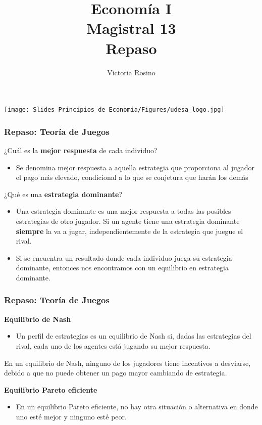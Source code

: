 \documentclass{beamer}
\title[Economía I]{Economía I \vspace{3mm}
\\ Magistral 13 \vspace{3mm} \\ Repaso}
\date{}
\author[Victoria Rosino]{Victoria Rosino}
\institute[]{Universidad de San Andrés}
\begin{document}
\begin{frame}
\vspace{0.3cm}
\titlepage
\centering
\vspace{-0.9cm}
\texttt{[image: Slides Principios de Economia/Figures/udesa\_logo.jpg]} 
\end{frame}



\begin{frame}
\frametitle{Repaso: Teoría de Juegos}
    ¿Cuál es la \textbf{mejor respuesta} de cada individuo?
    \begin{itemize}
        \item  Se denomina mejor respuesta a aquella estrategia que proporciona al jugador el pago más elevado, condicional a lo que se conjetura que harán los demás
    \end{itemize}
    \vspace{2mm}
    ¿Qué es una \textbf{estrategia dominante}?
    \begin{itemize}
        \item  Una estrategia dominante es una mejor respuesta a todas las posibles estrategias de otro jugador. Si un agente tiene una estrategia dominante \textbf{siempre} la va a jugar, independientemente de la estrategia que juegue el rival.
        \item Si se encuentra un resultado donde cada individuo juega su estrategia dominante, entonces nos encontramos con un equilibrio en estrategia dominante.
        \end{itemize}
\end{frame}

\begin{frame}
\frametitle{Repaso: Teoría de Juegos}
\textbf{Equilibrio de Nash}
    \begin{itemize}
        \item  Un perfil de estrategias es un equilibrio de Nash si, dadas las estrategias del rival, cada uno de los agentes está jugando su mejor respuesta.
    \end{itemize}
    \begin{boxB}
        \centering
        En un equilibrio de Nash, ninguno de los jugadores tiene incentivos a desviarse, debido a que no puede obtener un pago mayor cambiando de estrategia.
    \end{boxB}
   \textbf{ Equilibrio Pareto eficiente}
        \begin{itemize}
        \item   En un equilibrio Pareto eficiente, no hay otra situación o alternativa en donde uno esté mejor y ninguno esté peor. 
    \end{itemize}

\end{frame}
\end{document}
